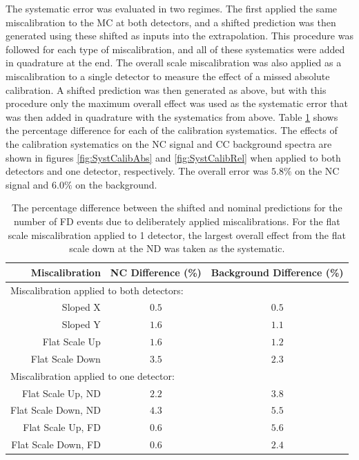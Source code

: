 The systematic error was evaluated in two regimes. The first applied the same miscalibration to the MC at both detectors, and a shifted prediction was then generated using these shifted as inputs into the extrapolation. This procedure was followed for each type of miscalibration, and all of these systematics were added in quadrature at the end. The overall scale miscalibration was also applied as a miscalibration to a single detector to measure the effect of a missed absolute calibration. A shifted prediction was then generated as above, but with this procedure only the maximum overall effect was used as the systematic error that was then added in quadrature with the systematics from above. Table \ref{tab:SystCalib} shows the percentage difference for each of the calibration systematics. The effects of the calibration systematics on the NC signal and CC background spectra are shown in figures \ref{fig:SystCalibAbs} and \ref{fig:SystCalibRel} when applied to both detectors and one detector, respectively. The overall error was $5.8\%$ on the NC signal and $6.0\%$ on the background.
\begin{table}[htb]
  \begin{center}
    \caption[Calibration Systematic Errors]{The percentage difference between the shifted and nominal predictions for the number of FD events due to deliberately applied miscalibrations. For the flat scale miscalibration applied to 1 detector, the largest overall effect from the flat scale down at the ND was taken as the systematic.}
    \label{tab:SystCalib}
    \begin{tabular}{r c c}
      \hline\hline
      Miscalibration & NC Difference (\%) & Background Difference (\%) \\
      \hline
      \multicolumn{3}{l}{Miscalibration applied to both detectors:} \\
      Sloped X & $0.5$ & $0.5$ \\
      Sloped Y & $1.6$ & $1.1$ \\
      Flat Scale Up & $1.6$ & $1.2$ \\
      Flat Scale Down & $3.5$ & $2.3$ \\
      \multicolumn{3}{l}{Miscalibration applied to one detector:} \\
      Flat Scale Up, ND & $2.2$ & $3.8$ \\
      Flat Scale Down, ND & $4.3$ & $5.5$ \\
      Flat Scale Up, FD & $0.6$ & $5.6$ \\
      Flat Scale Down, FD & $0.6$ & $2.4$ \\
      \hline
    \end{tabular}
  \end{center}
\end{table}

